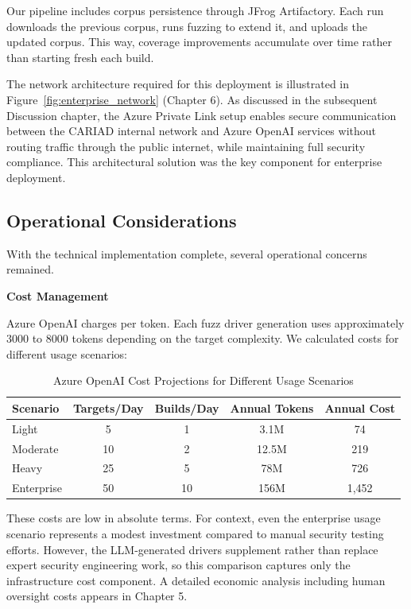 Our pipeline includes corpus persistence through JFrog Artifactory. Each run downloads the previous corpus, runs fuzzing to extend it, and uploads the updated corpus. This way, coverage improvements accumulate over time rather than starting fresh each build.

The network architecture required for this deployment is illustrated in Figure~\ref{fig:enterprise_network} (Chapter 6). As discussed in the subsequent Discussion chapter, the Azure Private Link setup enables secure communication between the CARIAD internal network and Azure OpenAI services without routing traffic through the public internet, while maintaining full security compliance. This architectural solution was the key component for enterprise deployment.

\subsection{Operational Considerations}

With the technical implementation complete, several operational concerns remained.

\textbf{Cost Management}

Azure OpenAI charges per token. Each fuzz driver generation uses approximately 3000 to 8000 tokens depending on the target complexity. We calculated costs for different usage scenarios:

\begin{table}[htbp]
\centering
\caption{Azure OpenAI Cost Projections for Different Usage Scenarios}
\label{tab:cost_scenarios_impl}
\small
\begin{tabular}{lcccc}
\toprule
Scenario & Targets/Day & Builds/Day & Annual Tokens & Annual Cost \\
\midrule
Light & 5 & 1 & 3.1M & \texteuro{}74 \\
Moderate & 10 & 2 & 12.5M & \texteuro{}219 \\
Heavy & 25 & 5 & 78M & \texteuro{}726 \\
Enterprise & 50 & 10 & 156M & \texteuro{}1,452 \\
\bottomrule
\end{tabular}
\end{table}

These costs are low in absolute terms. For context, even the enterprise usage scenario represents a modest investment compared to manual security testing efforts. However, the LLM-generated drivers supplement rather than replace expert security engineering work, so this comparison captures only the infrastructure cost component. A detailed economic analysis including human oversight costs appears in Chapter 5.

